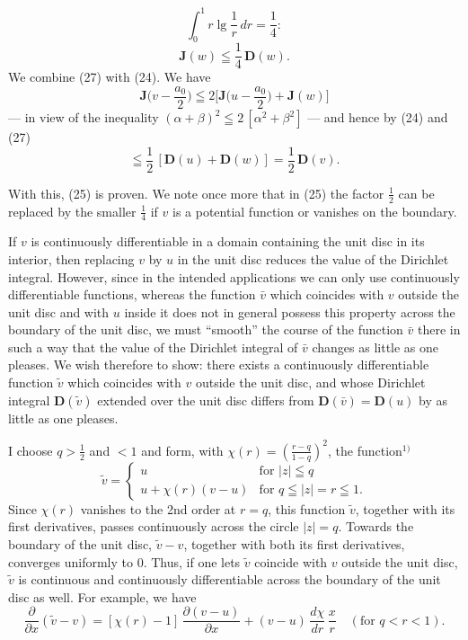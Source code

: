 \documentclass{article}
\begin{document}
\[ \int_0^1 r \lg\frac{1}{r}\,dr = \frac{1}{4}\colon \]
\[ \mathbf{J}(w) \leqq \frac{1}{4}\,\mathbf{D}(w). \tag{27} \]
We combine (27) with (24). We have
\[ \mathbf{J}\Big( v - \frac{a_0}{2} \Big) \leqq 2 \Big[ \mathbf{J}\Big( u - \frac{a_0}{2} \Big) + \mathbf{J}(w) \Big] \]
--- in view of the inequality $(\alpha + \beta)^2 \leqq 2\,[\alpha^2 + \beta^2]$ --- and hence by (24) and (27)
\[ \leqq \frac{1}{2}\,[\mathbf{D}(u) + \mathbf{D}(w)] = \frac{1}{2}\,\mathbf{D}(v). \]

With this, (25) is proven. We note once more that in (25) the factor $\frac{1}{2}$ can be replaced by the smaller $\frac{1}{4}$ if $v$ is a potential function or vanishes on the boundary.

If $v$ is continuously differentiable in a domain containing the unit disc in its interior, then replacing $v$ by $u$ in the unit disc reduces the value of the Dirichlet integral. However, since in the intended applications we can only use continuously differentiable functions, whereas the function $\bar{v}$ which coincides with $v$ outside the unit disc and with $u$ inside it does not in general possess this property across the boundary of the unit disc, we must ``smooth'' the course of the function $\bar{v}$ there in such a way that the value of the Dirichlet integral of $\bar{v}$ changes as little as one pleases. We wish therefore to show: there exists a continuously differentiable function $\tilde{v}$ which coincides with $v$ outside the unit disc, and whose Dirichlet integral $\mathbf{D}(\tilde{v})$ extended over the unit disc differs from $\mathbf{D}(\bar{v}) = \mathbf{D}(u)$ by as little as one pleases.

I choose $q > \frac{1}{2}$ and $< 1$ and form, with $\chi(r) = \left( \frac{r - q}{1 - q} \right)^2$, the function${}^{1)}$
\[ \tilde{v} = \begin{cases}
u & \text{for } |z| \leqq q \\
u + \chi(r)(v - u) & \text{for } q \leqq |z| = r \leqq 1.
\end{cases} \]
Since $\chi(r)$ vanishes to the 2nd order at $r = q$, this function $\tilde{v}$, together with its first derivatives, passes continuously across the circle $|z| = q$. Towards the boundary of the unit disc, $\tilde{v} - v$, together with both its first derivatives, converges uniformly to $0$. Thus, if one lets $\tilde{v}$ coincide with $v$ outside the unit disc, $\tilde{v}$ is continuous and continuously differentiable across the boundary of the unit disc as well. For example, we have
\[ \frac{\partial}{\partial x}(\tilde{v} - v) = [\chi(r) - 1]\,\frac{\partial(v - u)}{\partial x} + (v - u)\,\frac{d\chi}{dr}\,\frac{x}{r} \quad (\text{for } q < r < 1). \]
\end{document}
